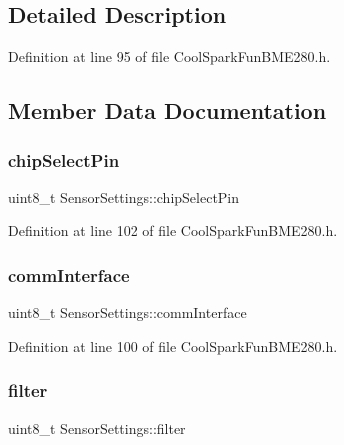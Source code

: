\subsection{Detailed Description}


Definition at line 95 of file Cool\+Spark\+Fun\+B\+M\+E280.\+h.



\subsection{Member Data Documentation}
\mbox{\label{struct_sensor_settings_abe2de606ebb580ad81e3fafb1a454580}} 
\subsubsection{\texorpdfstring{chip\+Select\+Pin}{chipSelectPin}}
{\footnotesize\ttfamily uint8\+\_\+t Sensor\+Settings\+::chip\+Select\+Pin}



Definition at line 102 of file Cool\+Spark\+Fun\+B\+M\+E280.\+h.

\mbox{\label{struct_sensor_settings_a5bf116387c543a6ea5732976424e8cb1}} 
\subsubsection{\texorpdfstring{comm\+Interface}{commInterface}}
{\footnotesize\ttfamily uint8\+\_\+t Sensor\+Settings\+::comm\+Interface}



Definition at line 100 of file Cool\+Spark\+Fun\+B\+M\+E280.\+h.

\mbox{\label{struct_sensor_settings_a69dc95368069a0f408a141d4c2cbf045}} 
\subsubsection{\texorpdfstring{filter}{filter}}
{\footnotesize\ttfamily uint8\+\_\+t Sensor\+Settings\+::filter}



